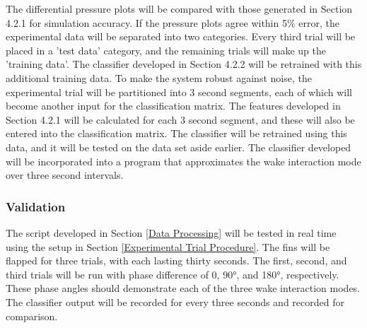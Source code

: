     The differential pressure plots will be compared with those generated in Section 4.2.1 for simulation accuracy. If the pressure plots agree within 5\% error, the experimental data will be separated into two categories. Every third trial will be placed in a 'test data' category, and the remaining trials will make up the 'training data'. The classifier developed in Section 4.2.2 will be retrained with this additional training data. To make the system robust against noise, the experimental trial will be partitioned into 3 second segments, each of which will become another input for the classification matrix. The features developed in Section 4.2.1 will be calculated for each 3 second segment, and these will also be entered into the classification matrix. The classifier will be retrained using this data, and it will be tested on the data set aside earlier. The classifier developed will be incorporated into a program that approximates the wake interaction mode over three second intervals.

    
\subsubsection{Validation}

    The script developed in Section \ref{Data Processing} will be tested in real time using the setup in Section \ref{Experimental Trial Procedure}. The fins will be flapped for three trials, with each lasting thirty seconds. The first, second, and third trials will be run with phase difference of 0, 90°, and 180°, respectively. These phase angles should demonstrate each of the three wake interaction modes. The classifier output will be recorded for every three seconds and recorded for comparison.
